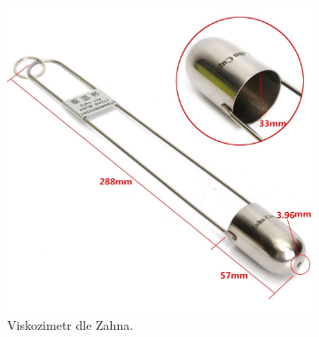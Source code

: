 \documentclass[12pt]{article}
\begin{document}
\begin{figure}
    \begin{subfigure}[b]{.3\textwidth}
        \includegraphics[width = \linewidth]{figures/zahn cup viscometer.jpg}
        \caption{Viskozimetr dle Zahna.~\cite{Figure:zahn_cup_viscometer}}
    \end{subfigure}
    \hfill
    \begin{subfigure}[b]{.3\textwidth}

\end{subfigure}
\end{figure}
\end{document}
